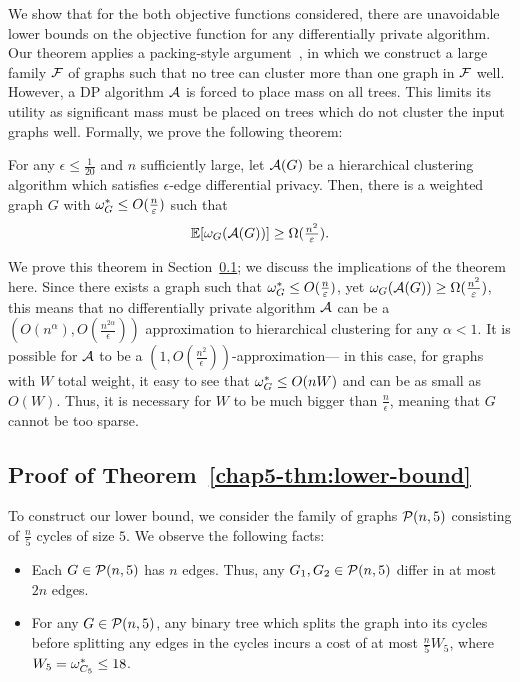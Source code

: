 We show that for the both objective functions considered, there are unavoidable lower bounds on the objective function for any differentially private algorithm.
Our theorem applies a packing-style argument~\citep{hardt2010geometry}, in which we construct a large family $\mathcal{F}$ of graphs such that no tree can cluster more than one graph in $\mathcal{F}$ well. However, a DP algorithm $\mathcal{A}$ is forced to place mass on all trees. This limits its utility as significant mass must be placed on trees which do not cluster the input graphs well. Formally, we prove the following theorem:

\begin{thm}\label{chap5-thm:lower-bound}
For any $\epsilon \leq \frac{1}{20}$ and $n$ sufficiently large, let $\mathcal{A}(G)$ be a hierarchical clustering algorithm which satisfies $\epsilon$-edge differential privacy. Then, there is a weighted graph $G$ with $\omega_G^* \leq O(\frac{n}{\varepsilon})$ such that 
\[
    \operatorname{\mathbb{E}}[\omega_{G}(\mathcal{A}(G))] \geq \Omega(\tfrac{n^2}{\varepsilon}).
\]
\end{thm}

We prove this theorem in Section~\ref{chap5-sec:lb-proof}; we discuss the implications of the theorem here. Since there exists a graph such that $\omega_G^* \leq O(\frac{n}{\varepsilon})$, yet $\omega_G(\mathcal{A}(G)) \geq \Omega(\frac{n^2}{\varepsilon})$, this means that no differentially private algorithm $\mathcal{A}$ can be a $(O(n^{\alpha}), O(\frac{n^{2\alpha}}{\epsilon}))$ approximation to hierarchical clustering for any $\alpha < 1$. It is possible for $\mathcal{A}$ to be a $(1, O(\frac{n^2}{\epsilon}))$-approximation--- in this case, for graphs with $W$ total weight, it easy to see that $\omega_G^* \leq O(nW)$ and can be as small as $O(W)$. Thus, it is necessary for $W$ to be much bigger than $\frac{n}{\epsilon}$, meaning that $G$ cannot be too sparse.

\subsection{Proof of Theorem~\ref{chap5-thm:lower-bound}}\label{chap5-sec:lb-proof}

To construct our lower bound, we consider the family of graphs $\mathcal{P}(n, 5)$ consisting of $\frac{n}{5}$ cycles of size $5$. We observe the following facts:
\begin{itemize}
    \item Each $G \in \mathcal{P}(n, 5)$ has $n$ edges. Thus, any $G_1, G_2 \in \mathcal{P}(n, 5)$ differ in at most $2n$ edges.
    \item For any $G \in \mathcal{P}(n, 5)$, any binary tree which splits the graph into its cycles before splitting any edges in the cycles incurs a cost of at most $\frac{n}{5} W_5$, where $W_5 = \omega_{C_5}^* \leq 18$.
\end{itemize}


